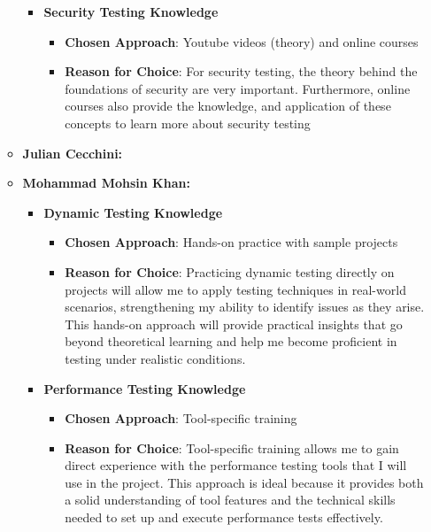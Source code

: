 \documentclass[12pt, titlepage]{article}
\begin{document}
\begin{enumerate}
\begin{itemize}
\begin{itemize}
      \item \textbf{Security Testing Knowledge}  
        \begin{itemize}
            \item \textbf{Chosen Approach}: Youtube videos (theory) and online
            courses
            \item \textbf{Reason for Choice}: For security testing, the theory
            behind the foundations of security are very important. Furthermore,
            online courses also provide the knowledge, and application of these
            concepts to learn more about security testing
        \end{itemize}
    \end{itemize}
    \item \textbf{Julian Cecchini:} 
    \item \textbf{Mohammad Mohsin Khan:}
    \begin{itemize}
      \item \textbf{Dynamic Testing Knowledge}  
      \begin{itemize}
          \item \textbf{Chosen Approach}: Hands-on practice with sample projects
          \item \textbf{Reason for Choice}: Practicing dynamic testing directly on projects will allow me to apply testing techniques in real-world scenarios, strengthening my ability to identify issues as they arise. This hands-on approach will provide practical insights that go beyond theoretical learning and help me become proficient in testing under realistic conditions.
      \end{itemize}
  
      \item \textbf{Performance Testing Knowledge}  
      \begin{itemize}
          \item \textbf{Chosen Approach}: Tool-specific training
          \item \textbf{Reason for Choice}: Tool-specific training allows me to gain direct experience with the performance testing tools that I will use in the project. This approach is ideal because it provides both a solid understanding of tool features and the technical skills needed to set up and execute performance tests effectively.
      \end{itemize}
  

\end{itemize}
\end{itemize}
\end{enumerate}
\end{document}
